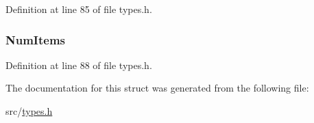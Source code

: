 Definition at line 85 of file types.\+h.

\hypertarget{struct_tel_dir___type_def_a84d6da72470ad7fca2b7482887203f3e}{}
\subsubsection[{Num\+Items}]{ Num\+Items}\label{struct_tel_dir___type_def_a84d6da72470ad7fca2b7482887203f3e}


Definition at line 88 of file types.\+h.



The documentation for this struct was generated from the following file\+:\begin{DoxyCompactItemize}
\item 
src/\hyperlink{types_8h}{types.\+h}\end{DoxyCompactItemize}
